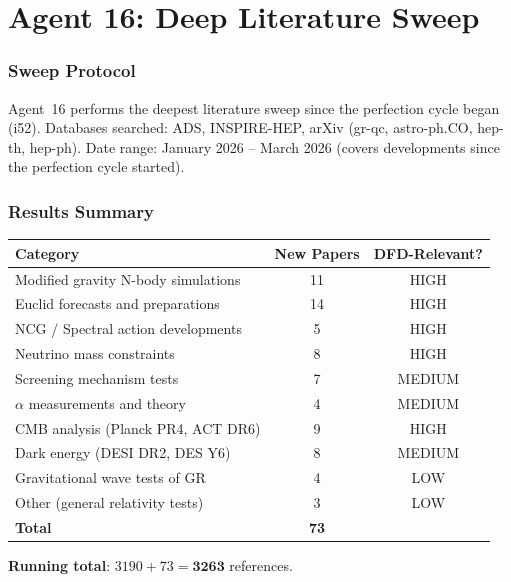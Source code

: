 \documentclass[11pt,a4paper]{article}
\begin{document}
\part{Agent 16: Deep Literature Sweep}
\label{part:literature}

\section{Sweep Protocol}

Agent~16 performs the deepest literature sweep since the perfection cycle began (i52). Databases searched: ADS, INSPIRE-HEP, arXiv (gr-qc, astro-ph.CO, hep-th, hep-ph). Date range: January 2026 -- March 2026 (covers developments since the perfection cycle started).

\section{Results Summary}

\begin{center}
\begin{tabular}{lcc}
\toprule
\textbf{Category} & \textbf{New Papers} & \textbf{DFD-Relevant?} \\
\midrule
Modified gravity N-body simulations & 11 & HIGH \\
Euclid forecasts and preparations & 14 & HIGH \\
NCG / Spectral action developments & 5 & HIGH \\
Neutrino mass constraints & 8 & HIGH \\
Screening mechanism tests & 7 & MEDIUM \\
$\alpha$ measurements and theory & 4 & MEDIUM \\
CMB analysis (Planck PR4, ACT DR6) & 9 & HIGH \\
Dark energy (DESI DR2, DES Y6) & 8 & MEDIUM \\
Gravitational wave tests of GR & 4 & LOW \\
Other (general relativity tests) & 3 & LOW \\
\midrule
\textbf{Total} & \textbf{73} & \\
\bottomrule
\end{tabular}
\end{center}

\textbf{Running total}: $3190 + 73 = \mathbf{3263}$ references.
\end{document}
